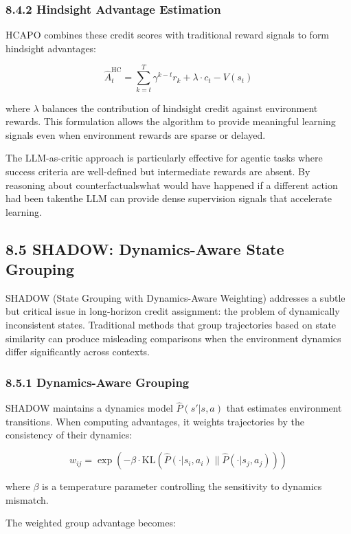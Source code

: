 \subsubsection{8.4.2 Hindsight Advantage Estimation}

HCAPO combines these credit scores with traditional reward signals to form hindsight advantages:

$$\hat{A}_t^{\text{HC}} = \sum_{k=t}^{T} \gamma^{k-t} r_k + \lambda \cdot c_t - V(s_t)$$

where $\lambda$ balances the contribution of hindsight credit against environment rewards. This formulation allows the algorithm to provide meaningful learning signals even when environment rewards are sparse or delayed.

The LLM-as-critic approach is particularly effective for agentic tasks where success criteria are well-defined but intermediate rewards are absent. By reasoning about counterfactualswhat would have happened if a different action had been takenthe LLM can provide dense supervision signals that accelerate learning.

\subsection{8.5 SHADOW: Dynamics-Aware State Grouping}

SHADOW (State Grouping with Dynamics-Aware Weighting) addresses a subtle but critical issue in long-horizon credit assignment: the problem of dynamically inconsistent states. Traditional methods that group trajectories based on state similarity can produce misleading comparisons when the environment dynamics differ significantly across contexts.

\subsubsection{8.5.1 Dynamics-Aware Grouping}

SHADOW maintains a dynamics model $\hat{P}(s'|s,a)$ that estimates environment transitions. When computing advantages, it weights trajectories by the consistency of their dynamics:

$$w_{ij} = \exp\left(-\beta \cdot \text{KL}\left(\hat{P}(\cdot|s_i, a_i) \| \hat{P}(\cdot|s_j, a_j)\right)\right)$$

where $\beta$ is a temperature parameter controlling the sensitivity to dynamics mismatch.

The weighted group advantage becomes:

